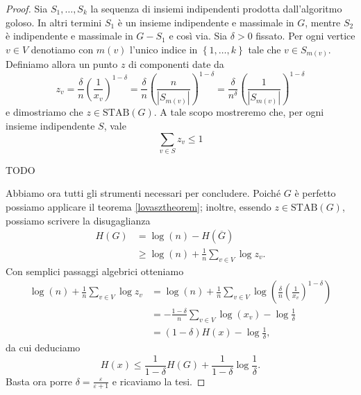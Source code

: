 \begin{proof}
	Sia \(S_1,\dots,S_k\) la sequenza di insiemi indipendenti prodotta dall'algoritmo goloso. In altri termini \(S_1\) è un insieme indipendente e massimale in \(G\), mentre \(S_2\) è indipendente e massimale in \(G-S_1\) e così via. Sia \(\delta>0\) fissato. Per ogni vertice \(v\in V\) denotiamo con \(m(v)\) l'unico indice in \(\left\{1,\dots,k\right\}\) tale che \(v\in S_{m(v)}\). Definiamo allora un punto \(z\) di componenti date da
	\[z_v=\frac{\delta}{n}\left(\frac{1}{x_v}\right)^{1-\delta}=\frac{\delta}{n}\left(\frac{n}{|S_{m(v)}|}\right)^{1-\delta}=\frac{\delta}{n^{\delta}}\left(\frac{1}{|S_{m(v)}|}\right)^{1-\delta}\]
	e dimostriamo che \(z\in\text{STAB}(G)\). A tale scopo mostreremo che, per ogni insieme indipendente \(S\), vale
	\[\sum_{v\in S}{z_v}\le 1\]
	
	TODO
	
	Abbiamo ora tutti gli strumenti necessari per concludere. Poiché \(G\) è perfetto possiamo applicare il teorema \ref{lovasztheorem}; inoltre, essendo \(z\in\text{STAB}(G)\), possiamo scrivere la disugaglianza
	\begin{align}
	  H(G)&=\log(n)-H(\overline{G}) \nonumber \\
	      &\ge \log(n) + \frac{1}{n}\sum_{v\in V}{\log{z_v}}.\nonumber
	\end{align}
	Con semplici passaggi algebrici otteniamo
	\begin{align}
	     \log(n) + \frac{1}{n}\sum_{v\in V}{\log{z_v}} &= \log(n) + \frac{1}{n}\sum_{v\in V}{\log\left(\frac{\delta}{n}\left(\frac{1}{x_v}\right)^{1-\delta}\right)} \nonumber \\
	      &= - \frac{1-\delta}{n}\sum_{v\in V}{\log(x_v)}-\log{\frac{1}{\delta}} \nonumber \\
	      &= (1-\delta)H(x)-\log{\frac{1}{\delta}} \nonumber,
	\end{align}
	da cui deduciamo
	\[H(x)\le\frac{1}{1-\delta}H(G)+\frac{1}{1-\delta}\log{\frac{1}{\delta}}.\]
	Basta ora porre \(\delta=\frac{\varepsilon}{\varepsilon+1}\) e ricaviamo la tesi.
\end{proof}
